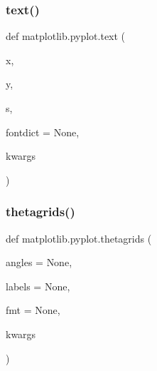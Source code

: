 \mbox{\label{namespacematplotlib_1_1pyplot_a88aae7706a5442308884b8726d64a505}} 
\subsubsection{\texorpdfstring{text()}{text()}}
{\footnotesize\ttfamily def matplotlib.\+pyplot.\+text (\begin{DoxyParamCaption}\item[{}]{x,  }\item[{}]{y,  }\item[{}]{s,  }\item[{}]{fontdict = {\ttfamily None},  }\item[{}]{kwargs }\end{DoxyParamCaption})}

\mbox{\label{namespacematplotlib_1_1pyplot_a811c604e11c9ac8927b277e6e8204a6e}} 
\subsubsection{\texorpdfstring{thetagrids()}{thetagrids()}}
{\footnotesize\ttfamily def matplotlib.\+pyplot.\+thetagrids (\begin{DoxyParamCaption}\item[{}]{angles = {\ttfamily None},  }\item[{}]{labels = {\ttfamily None},  }\item[{}]{fmt = {\ttfamily None},  }\item[{}]{kwargs }\end{DoxyParamCaption})}

